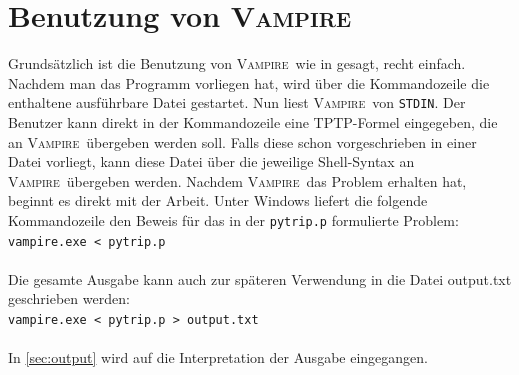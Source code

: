 \documentclass{article}
\newcommand{\vampire}{\textsc{Vampire}~}
\begin{document}
\section{Benutzung von \vampire}
\label{sec:invocation}
Grundsätzlich ist die Benutzung von \vampire wie in \cite{cav2013} gesagt, recht einfach. Nachdem man das Programm vorliegen hat, wird über die Kommandozeile die enthaltene ausführbare Datei gestartet. Nun liest \vampire von \texttt{STDIN}. Der Benutzer kann direkt in der Kommandozeile eine TPTP-Formel eingegeben, die an \vampire übergeben werden soll. Falls diese schon vorgeschrieben in einer Datei vorliegt, kann diese Datei über die jeweilige Shell-Syntax an \vampire übergeben werden. Nachdem \vampire das Problem erhalten hat, beginnt es direkt mit der Arbeit. 
Unter Windows liefert die folgende Kommandozeile den Beweis für das in der \verb|pytrip.p| 
formulierte Problem:\\

\texttt{vampire.exe < pytrip.p}\\\\
Die gesamte Ausgabe kann auch zur späteren Verwendung in die Datei output.txt geschrieben werden:\\

\texttt{vampire.exe < pytrip.p > output.txt}\\\\
In \ref{sec:output} wird auf die Interpretation der Ausgabe eingegangen.
\end{document}
